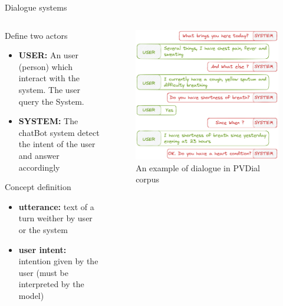 \documentclass[10pt,aspectratio=169]{beamer}
\begin{document}
\begin{frame}{Dialogue systems}
    \begin{columns}
        \begin{column}{0.5\textwidth}
            \begin{block}{Define two actors}
                \begin{itemize}
                    \item \textbf{USER:} An user (person) which interact with the system. The user query the System. 
                    \item \textbf{SYSTEM:} The chatBot system detect the intent of the user and answer accordingly 
                \end{itemize}
            \end{block}
            \begin{block}{Concept definition}
                \begin{itemize}
                    \item \textbf{utterance:} text of a turn weither by user or the system
                    \item \textbf{user intent:} intention given by the user (must be interpreted by the model)
                \end{itemize}
            \end{block}
        \end{column}
        \begin{column}{0.5\textwidth}
            \begin{figure}
                \centering
                \includegraphics[width=.9\textwidth]{media/dialogue_patient.png}
                \caption{An example of dialogue in PVDial corpus}
                \label{fig:example-pvdial}
            \end{figure}
        \end{column}
    \end{columns}
\end{frame}
\end{document}
